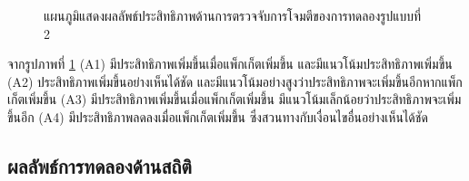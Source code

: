 \begin{figure}[h!]
    \centering
    \caption{แผนภูมิแสดงผลลัพธ์ประสิทธิภาพด้านการตรวจจับการโจมตีของการทดลองรูปแบบที่ 2}
    \label{img:graph_atk_2}
\end{figure}

จากรูปภาพที่ \ref{img:graph_atk_2} (A1) มีประสิทธิภาพเพิ่มขึ้นเมื่อแพ็กเก็ตเพิ่มขึ้น และมีแนวโน้มประสิทธิภาพเพิ่มขึ้น
(A2) ประสิทธิภาพเพิ่มขึ้นอย่างเห็นได้ชัด และมีแนวโน้มอย่างสูงว่าประสิทธิภาพจะเพิ่มขึ้นอีกหากแพ็กเก็ตเพิ่มขึ้น
(A3) มีประสิทธิภาพเพิ่มขึ้นเมื่อแพ็กเก็ตเพิ่มขึ้น มีแนวโน้มเล็กน้อยว่าประสิทธิภาพจะเพิ่มขึ้นอีก
(A4) มีประสิทธิภาพลดลงเมื่อแพ็กเก็ตเพิ่มขึ้น ซึ่งสวนทางกับเงื่อนไขอื่นอย่างเห็นได้ชัด
\\
\subsection{ผลลัพธ์การทดลองด้านสถิติ}

